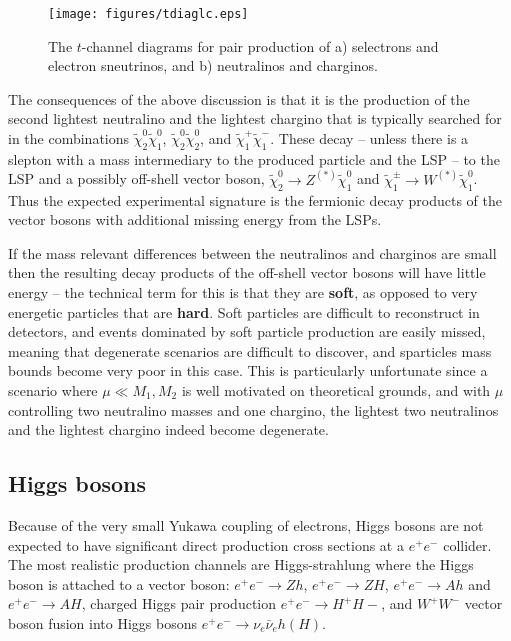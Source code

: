\documentclass[notes.tex]{subfiles}
\begin{document}
\begin{figure}[h!]
\begin{center}
\texttt{[image: figures/tdiaglc.eps]} 
\caption{The $t$-channel diagrams for pair production of a) selectrons and electron sneutrinos, and b) neutralinos and charginos.}
\label{fig:tdiag}
\end{center}
\end{figure}

The consequences of the above discussion is that it is the production of the second lightest neutralino and the lightest chargino that is typically searched for in the combinations $\tilde\chi_2^0\tilde\chi_1^0$, $\tilde\chi_2^0\tilde\chi_2^0$, and $\tilde\chi_1^+\tilde\chi_1^-$. These decay -- unless there is a slepton with a mass intermediary to the produced particle and the LSP -- to the LSP and a possibly off-shell vector boson, $\tilde\chi_2^0\to Z^{(*)}\tilde\chi_1^0$ and $\tilde\chi_1^\pm\to W^{(*)}\tilde\chi_1^0$. Thus the expected  experimental signature is the fermionic decay products of the vector bosons with additional missing energy from the LSPs. 

If the mass relevant differences between the neutralinos and charginos are small then the resulting decay products of the off-shell vector bosons will have little energy -- the technical term for this is that they are {\bf soft}, as opposed to very energetic particles that are {\bf hard}. Soft particles are difficult to reconstruct in detectors, and events dominated by soft particle production are easily missed, meaning that degenerate scenarios are difficult to discover, and sparticles mass bounds become very poor in this case. This is particularly unfortunate since a scenario where $\mu\ll M_1,M_2$ is well motivated on theoretical grounds, and with $\mu$ controlling two neutralino masses and one chargino, the lightest two neutralinos and the lightest chargino indeed become degenerate.


\subsection{Higgs bosons}
Because of the very small Yukawa coupling of electrons, Higgs bosons are not expected to have significant direct production cross sections at a $e^+e^-$ collider. The most realistic production channels are Higgs-strahlung where the Higgs boson is attached to a vector boson: $e^+e^-\to Zh$, $e^+e^-\to ZH$, $e^+e^-\to Ah$ and $e^+e^-\to AH$, charged Higgs pair production $e^+e^-\to H^+H-$, and $W^+W^-$ vector boson fusion into Higgs bosons $e^+e^-\to \nu_e\bar\nu_e h(H)$. 
\end{document}
